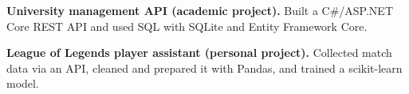 
\begin{cvparagraph}
\noindent\textbf{University management API (academic project).} Built a C\#/ASP.NET Core REST API and used SQL with SQLite and Entity Framework Core.\par
\noindent\textbf{League of Legends player assistant (personal project).} Collected match data via an API, cleaned and prepared it with Pandas, and trained a scikit-learn model.
\end{cvparagraph}
